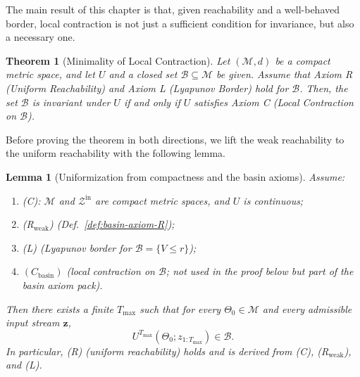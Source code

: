 \documentclass[12pt]{article}
\theoremstyle{definition}
\theoremstyle{plain}
\newtheorem{theorem}{Theorem}[section]
\newtheorem{lemma}{Lemma}[section]
\begin{document}
The main result of this chapter is that, given reachability and a well-behaved border, local contraction is not just a sufficient condition for invariance, but also a necessary one.

\begin{theorem}[Minimality of Local Contraction]
\label{thm:minimality_local_contraction}
Let $(\mathcal{M}, d)$ be a compact metric space, and let $U$ and a closed set $\mathcal{B} \subseteq \mathcal{M}$ be given. Assume that Axiom R (Uniform Reachability) and Axiom L (Lyapunov Border) hold for $\mathcal{B}$. Then, the set $\mathcal{B}$ is invariant under $U$ if and only if $U$ satisfies Axiom C (Local Contraction on $\mathcal{B}$).
\end{theorem}

Before proving the theorem in both directions, we lift the weak reachability to the uniform reachability with the following lemma.

\begin{lemma}[Uniformization from compactness and the basin axioms]
\label{lem:uniformization-no-T}
Assume:
\begin{enumerate}
  \item \textup{(C)}: $\mathcal M$ and $\mathcal Z^{\mathrm{in}}$ are compact metric spaces, and $U$ is continuous;
  \item \textup{(R$_{\mathrm{weak}}$)} (Def.~\ref{def:basin-axiom-R});
  \item \textup{(L)} (Lyapunov border for $\mathcal B=\{V\le r\}$);
  \item \textup{$(C_{\mathrm{basin}})$} (local contraction on $\mathcal B$; not used in the proof below but part of the basin axiom pack).
\end{enumerate}
Then there exists a finite $T_{\max}$ such that for every $\Theta_0\in\mathcal M$ and every admissible input stream $\mathbf z$,
\[
U^{T_{\max}}(\Theta_0;z_{1:T_{\max}})\in\mathcal B.
\]
In particular, \textup{(R)} (uniform reachability) holds and is \emph{derived} from \textup{(C)}, \textup{(R$_{\mathrm{weak}}$)}, and \textup{(L)}.
\end{lemma}
\end{document}

